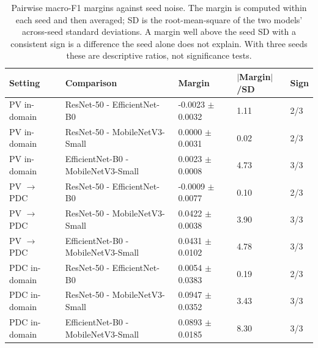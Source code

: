 \begin{table}[htbp]
\caption{Pairwise macro-F1 margins against seed noise. The margin is computed within each seed and then averaged; SD is the root-mean-square of the two models' across-seed standard deviations. A margin well above the seed SD with a consistent sign is a difference the seed alone does not explain. With three seeds these are descriptive ratios, not significance tests.}
\label{tab:ranking-margins-compact}
\scriptsize
\centering
\setlength{\tabcolsep}{4pt}
\begin{tabular}{lllll}
\toprule
Setting & Comparison & Margin & $|$Margin$|$/SD & Sign \\
\midrule
PV in-domain & ResNet-50 - EfficientNet-B0 & -0.0023 $\pm$ 0.0032 & 1.11 & 2/3 \\
PV in-domain & ResNet-50 - MobileNetV3-Small & 0.0000 $\pm$ 0.0031 & 0.02 & 2/3 \\
PV in-domain & EfficientNet-B0 - MobileNetV3-Small & 0.0023 $\pm$ 0.0008 & 4.73 & 3/3 \\
PV $\rightarrow$ PDC & ResNet-50 - EfficientNet-B0 & -0.0009 $\pm$ 0.0077 & 0.10 & 2/3 \\
PV $\rightarrow$ PDC & ResNet-50 - MobileNetV3-Small & 0.0422 $\pm$ 0.0038 & 3.90 & 3/3 \\
PV $\rightarrow$ PDC & EfficientNet-B0 - MobileNetV3-Small & 0.0431 $\pm$ 0.0102 & 4.78 & 3/3 \\
PDC in-domain & ResNet-50 - EfficientNet-B0 & 0.0054 $\pm$ 0.0383 & 0.19 & 2/3 \\
PDC in-domain & ResNet-50 - MobileNetV3-Small & 0.0947 $\pm$ 0.0352 & 3.43 & 3/3 \\
PDC in-domain & EfficientNet-B0 - MobileNetV3-Small & 0.0893 $\pm$ 0.0185 & 8.30 & 3/3 \\
\bottomrule
\end{tabular}
\end{table}
